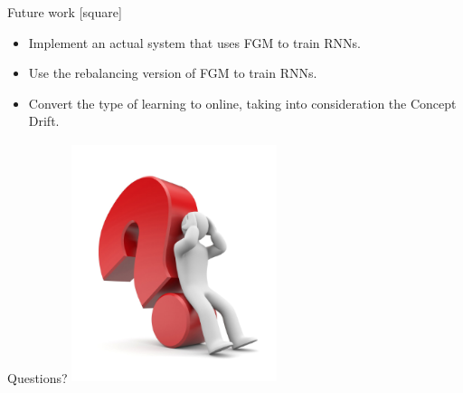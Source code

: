 \documentclass{beamer}
\begin{document}
    \begin{frame}{Future work}
        [square]
        \begin{itemize}
            \item{Implement an actual system that uses FGM to train RNNs.}
            \vspace{1cm}
            \item{Use the rebalancing version of FGM to train RNNs.}
            \vspace{1cm}
            \item{Convert the type of learning to online, taking into consideration the Concept Drift.}
        \end{itemize}
    \end{frame}

    \begin{frame}{Questions?}
        \centering
        \includegraphics[width=6cm,height=7cm]{images/question-mark.png}
    \end{frame}
\end{document}
